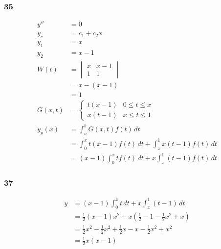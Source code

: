 \documentclass{article}
\begin{document}
\subsubsection{35}

\begin{align*}
  y''     & = 0                                                           \\
  y_c     & = c_1 + c_2 x                                                 \\
  y_1     & = x                                                           \\
  y_2     & = x - 1                                                       \\
  W(t)    & = \begin{vmatrix}
                x & x - 1 \\
                1 & 1
              \end{vmatrix}                                              \\
          & = x - (x - 1)                                                 \\
          & = 1                                                           \\
  G(x, t) & = \begin{cases}
                t (x - 1) & 0 \le t \le x \\
                x (t - 1) & x \le t \le 1
              \end{cases}                                   \\
  y_p(x)  & = \int_a^b G(x, t) f(t) \,dt                                  \\
          & = \int_0^x t (x - 1) f(t) \,dt + \int_x^1 x (t - 1) f(t) \,dt \\
          & = (x - 1) \int_0^x t f(t) \,dt + x \int_x^1 (t - 1) f(t) \,dt
\end{align*}

\subsubsection{37}

\begin{align*}
  y & = (x - 1) \int_0^x t \,dt + x \int_x^1 (t - 1) \,dt                                \\
    & = \frac{1}{2} (x - 1) x^2 + x \left( \frac{1}{2} - 1 - \frac{1}{2} x^2 + x \right) \\
    & = \frac{1}{2} x^2 - \frac{1}{2} x^2 + \frac{1}{2} x - x - \frac{1}{2} x^2 + x^2    \\
    & = \frac{1}{2} x (x - 1)
\end{align*}
\end{document}

